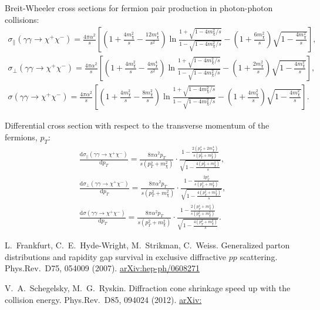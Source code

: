 \documentclass[a4paper,12pt]{article}
\begin{document}
Breit-Wheeler cross sections for fermion pair production in photon-photon
collisions:
\begin{gather}
    \sigma_\parallel(\gamma \gamma \to \chi^+ \chi^-)
    = \frac{4 \pi \alpha^2}{s}
      \left[
        \left( 1 + \frac{4 m_\chi^2}{s} - \frac{12 m_\chi^4}{s^2} \right)
        \ln \frac{1 + \sqrt{1 - 4 m_\chi^2 / s}}
                 {1 - \sqrt{1 - 4 m_\chi^2 / s}}
        - \left( 1 + \frac{6 m_\chi^2}{s} \right)
          \sqrt{1 - \frac{4 m_\chi^2}{s}}
      \right],
    \\
    \sigma_\perp(\gamma \gamma \to \chi^+ \chi^-)
    = \frac{4 \pi \alpha^2}{s}
      \left[
        \left( 1 + \frac{4 m_\chi^2}{s} - \frac{4 m_\chi^4}{s^2} \right)
        \ln \frac{1 + \sqrt{1 - 4 m_\chi^2 / s}}
                 {1 - \sqrt{1 - 4 m_\chi^2 / s}}
        - \left( 1 + \frac{2 m_\chi^2}{s} \right)
          \sqrt{1 - \frac{4 m_\chi^2}{s}}
      \right],
    \\
    \sigma(\gamma \gamma \to \chi^+ \chi^-)
    = \frac{4 \pi \alpha^2}{s}
      \left[
        \left( 1 + \frac{4 m_\chi^2}{s} - \frac{8 m_\chi^2}{s} \right)
        \ln \frac{1 + \sqrt{1 - 4 m_\chi^2 / s}}
                 {1 - \sqrt{1 - 4 m_\chi^2 / s}}
        - \left( 1 + \frac{4 m_\chi^2}{s} \right)
          \sqrt{1 - \frac{4 m_\chi^2}{s}}
     \right].
\end{gather}

Differential cross section with respect to the transverse momentum of the
fermions, $p_T$:
\begin{gather}
  \frac{\mathrm{d} \sigma_\parallel(\gamma \gamma \to \chi^+ \chi^-)}
       {\mathrm{d} p_T}
  = \frac{8 \pi \alpha^2 p_T}{s (p_T^2 + m_\chi^2)}
    \cdot \frac{1 - \frac{2 (p_T^4 + 2 m_\chi^4)}{s (p_T^2 + m_\chi^2)}}
               {\sqrt{1 - \frac{4 (p_T^2 + m_\chi^2)}{s}}},
  \\
  \frac{\mathrm{d} \sigma_\perp(\gamma \gamma \to \chi^+ \chi^-)}
       {\mathrm{d} p_T}
  = \frac{8 \pi \alpha^2 p_T}{s (p_T^2 + m_\chi^2)}
    \cdot \frac{1 - \frac{2 p_T^4}{s (p_T^2 + m_\chi^2)}}
               {\sqrt{1 - \frac{4 (p_T^2 + m_\chi^2)}{s}}},
  \\
  \frac{\mathrm{d} \sigma(\gamma \gamma \to \chi^+ \chi^-)}
       {\mathrm{d} p_T}
  = \frac{8 \pi \alpha^2 p_T}{s (p_T^2 + m_\chi^2)}
    \cdot \frac{1 - \frac{2 (p_T^4 + m_\chi^4)}{s (p_T^2 + m_\chi^2)}}
               {\sqrt{1 - \frac{4 (p_T^2 + m_\chi^2)}{s}}}.
\end{gather}

\newcommand{\arxiv}[1]{\href{http://arxiv.org/abs/#1}{arXiv:\nolinebreak[3]#1}}
\begin{thebibliography}{99}
  L.~Frankfurt, C.~E.~Hyde-Wright, M.~Strikman, C.~Weiss.
  Generalized parton distributions and rapidity gap survival in exclusive diffractive $p p$ scattering.
  Phys.Rev.~D75, 054009 (2007).
  \href{http://arxiv.org/abs/hep-ph/0608271}{arXiv:\nolinebreak[3]hep-ph/0608271}

  V.~A.~Schegelsky, M.~G.~Ryskin.
  Diffraction cone shrinkage speed up with the collision energy.
  Phys.Rev.~D85, 094024 (2012).
  \arxiv{1112.3243}
\end{thebibliography}
\end{document}
